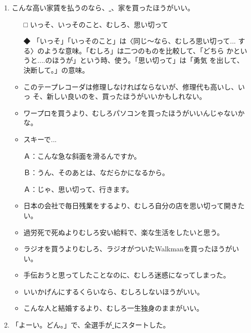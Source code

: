 \documentclass[
uplatex,
b5paper,
10pt,
dvipdfmx
]{jsbook}
\begin{document}
\begin{enumerate}
\item こんな高い家賃を払うのなら、\underline{    }、家を買ったほうがいい。
\begin{itemize}
\item[□] いっそ、いっそのこと、むしろ、思い切って
\item[◆] 「いっそ」「いっそのこと」は〈同じ〜なら、むしろ思い切って...
	  する〉のような意味。「むしろ」は二つのものを比較して、「どちら
	  かというと....のほうが」という時、使う。「思い切って」は「勇気
	  を出して、決断して。」の意味。
\end{itemize}
\begin{itemize}
\item このテープレコーダは修理しなければならないが、修理代も高いし、いっ
      そ、新しい良いのを、買ったほうがいいかもしれない。
\item ワープロを買うより、むしろパソコンを買ったほうがいいんじゃないかな。
\item スキーで...

      Ａ：こんな急な斜面を滑るんですか。

      Ｂ：うん、そのあとは、なだらかになるから。

      Ａ：じゃ、思い切って、行きます。

\item 日本の会社で毎日残業をするより、むしろ自分の店を思い切って開きたい。
\item 過労死で死ぬよりむしろ安い給料で、楽な生活をしたいと思う。
\item ラジオを買うよりむしろ、ラジオがついたWalkmanを買ったほうがいい。
\item 手伝おうと思ってしたことなのに、むしろ迷惑になってしまった。
\item いいかげんにするくらいなら、むしろしないほうがいい。
\item こんな人と結婚するより、むしろ一生独身のままがいい。
\end{itemize}


\item 「よーい。どん。」で、全選手が\underline{   }にスタートした。


\end{enumerate}
\end{document}
